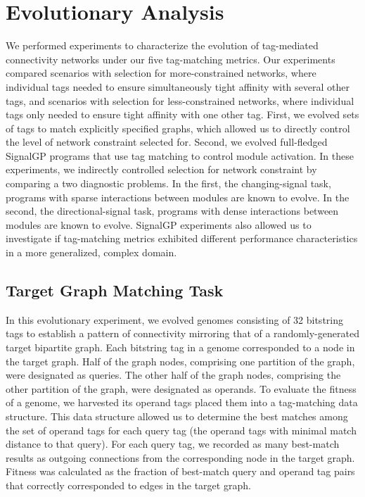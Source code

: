 \section{Evolutionary Analysis}



We performed experiments to characterize the evolution of tag-mediated connectivity networks under our five tag-matching metrics.
Our experiments compared scenarios with selection for more-constrained networks, where individual tags needed to ensure simultaneously tight affinity with several other tags, and scenarios with selection for less-constrained networks, where individual tags only needed to ensure tight affinity with one other tag. 
First, we evolved sets of tags to match explicitly specified graphs, which allowed us to directly control the level of network constraint selected for.
Second, we evolved full-fledged SignalGP programs that use tag matching to control module activation.
In these experiments, we indirectly controlled selection for network constraint by comparing a two diagnostic problems.
In the first, the changing-signal task, programs with sparse interactions between modules are known to evolve.
In the second, the directional-signal task, programs with dense interactions between modules are known to evolve.
SignalGP experiments also allowed us to investigate if tag-matching metrics exhibited different performance characteristics in a more generalized, complex domain.

\subsection{Target Graph Matching Task}

In this evolutionary experiment, we evolved genomes consisting of 32 bitstring tags to establish a pattern of connectivity mirroring that of a randomly-generated target bipartite graph.
Each bitstring tag in a genome corresponded to a node in the target graph.
Half of the graph nodes, comprising one partition of the graph, were designated as queries.
The other half of the graph nodes, comprising the other partition of the graph, were designated as operands.
To evaluate the fitness of a genome, we harvested its operand tags placed them into a tag-matching data structure.
This data structure allowed us to determine the best matches among the set of operand tags for each query tag (the operand tags with minimal match distance to that query).
For each query tag, we recorded as many best-match results as outgoing connections from the corresponding node in the target graph.
Fitness was calculated as the fraction of best-match query and operand tag pairs that correctly corresponded to edges in the target graph.

